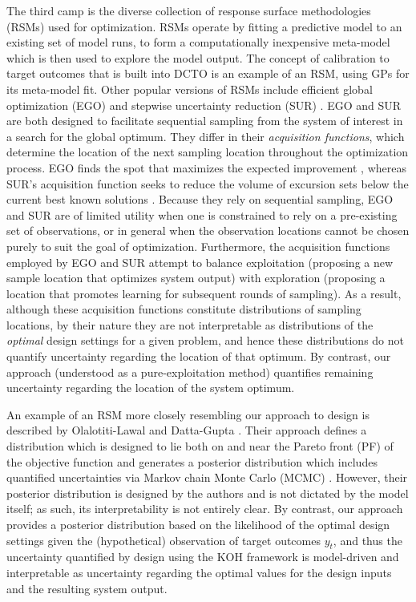 \documentclass[twocolumn,10pt]{asme2ej}
\begin{document}
%
The third camp is the diverse collection of response surface methodologies (RSMs) \cite{Dean2017} used for optimization.
%
RSMs operate by fitting a predictive model to an existing set of model runs, to form a computationally inexpensive meta-model which is then used to explore the model output.
%
The concept of calibration to target outcomes that is built into DCTO is an example of an RSM, using GPs for its meta-model fit.
%
Other popular versions of RSMs include efficient global optimization (EGO) \cite{Jones1998,Brochu2010} and stepwise uncertainty reduction (SUR) \cite{Geman1996,Villemonteix2009,Chevalier2014,Picheny2015,MiguelHernandez-Lobato2016,Picheny2019,Binois2019}.
%
EGO and SUR are both designed to facilitate sequential sampling from the system of interest in a search for the global optimum.
%
They differ in their \textit{acquisition functions}, which determine the location of the next sampling location throughout the optimization process.
%
EGO finds the spot that maximizes the expected improvement \cite{Mockus1978,Jones1998}, whereas SUR's acquisition function seeks to reduce the volume of excursion sets below the current best known solutions \cite{Chevalier2014}.
%
Because they rely on sequential sampling, EGO and SUR are of limited utility when one is constrained to rely on a pre-existing set of observations, or in general when the observation locations cannot be chosen purely to suit the goal of optimization.
%
Furthermore, the acquisition functions employed by EGO and SUR attempt to balance exploitation (proposing a new sample location that optimizes system output) with exploration (proposing a location that promotes learning for subsequent rounds of sampling).
%
As a result, although these acquisition functions constitute distributions of sampling locations, by their nature they are not interpretable as distributions of the \textit{optimal} design settings for a given problem, and hence these distributions do not quantify uncertainty regarding the location of that optimum.
%
By contrast, our approach (understood as a pure-exploitation method) quantifies remaining uncertainty regarding the location of the system optimum.
%

%
An example of an RSM more closely resembling our approach to design is described by Olalotiti-Lawal and Datta-Gupta \cite{Olalotiti2018}.
%
Their approach defines a distribution which is designed to lie both on and near the Pareto front (PF) of the objective function and generates a posterior distribution which includes quantified uncertainties via Markov chain Monte Carlo (MCMC) \cite{Gelfand1990}.
%
However, their posterior distribution is designed by the authors and is not dictated by the model itself; as such, its interpretability is not entirely clear.
%
By contrast, our approach provides a posterior distribution based on the likelihood of the optimal design settings given the (hypothetical) observation of target outcomes $y_t$, and thus the uncertainty quantified by design using the KOH framework is model-driven and interpretable as uncertainty regarding the optimal values for the design inputs and the resulting system output.
%
\end{document}
